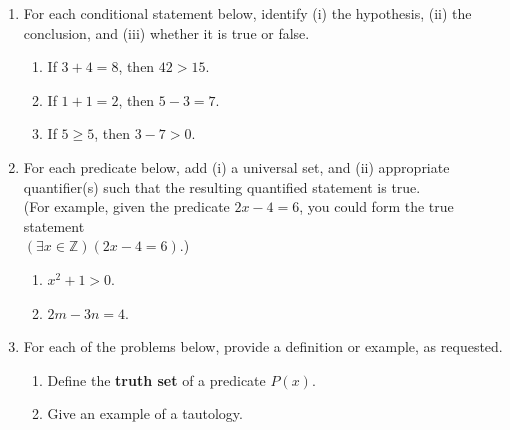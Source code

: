 \documentclass[12pt]{article}
\newcommand{\points}[1]{\marginpar{\hspace{24pt}[#1]}}
\begin{document}
\begin{enumerate}
\item For each conditional statement below, identify (i) the hypothesis, (ii) the conclusion, and (iii) whether it is true or false.
\begin{enumerate}
 \item If $3+4=8$, then $42>15$. \points{2}

\vspace{1in}

 \item If $1+1=2$, then $5-3=7$. \points{2}

\vspace{1in}

 \item If $5\geq 5$, then $3-7>0$. \points{2}

\end{enumerate}

\vspace{1in}

\item For each predicate below, add (i) a universal set, and (ii) appropriate quantifier(s) such that the resulting quantified statement is true.\\
(For example, given the predicate $2x-4=6$, you could form the true statement\\ $(\exists x\in\mathbb{Z})(2x-4=6)$.)

\begin{enumerate}
 \item $x^2+1>0$. \points{2}

\vspace{1in}

 \item $2m-3n=4$. \points{2}

\end{enumerate}



\newpage

\item For each of the problems below, provide a definition or example, as requested.
\begin{enumerate}
\item Define the {\bf truth set} of a predicate $P(x)$. \points{2}

\vspace{1.5in}

\item Give an example of a tautology. \points{2}

\vspace{1.5in} 


\end{enumerate}
\end{enumerate}
\end{document}
